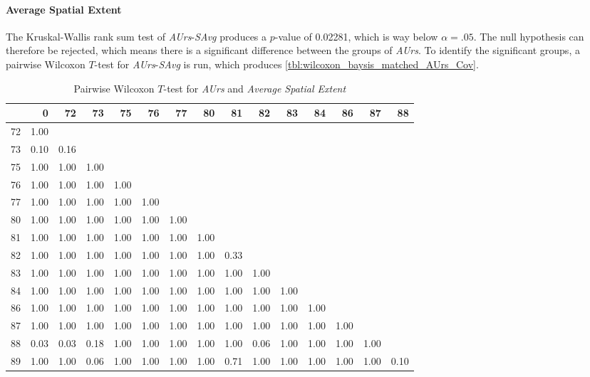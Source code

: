 \paragraph{Average Spatial Extent}
The Kruskal-Wallis rank sum test of \textit{AUrs}-\textit{SAvg} produces a $p$-value of 0.02281, which is way below $\alpha=.05$. The null hypothesis can therefore be rejected, which means there is a significant difference between the groups of \textit{AUrs}. To identify the significant groups, a pairwise Wilcoxon $T$-test for \textit{AUrs}-\textit{SAvg} is run, which produces \cref{tbl:wilcoxon_baysis_matched_AUrs_Cov}.
\begin{table}[ht]
	\tiny
	\centering
	\begin{tabular}{rrrrrrrrrrrrrrr}
		\toprule
		& 0 & 72 & 73 & 75 & 76 & 77 & 80 & 81 & 82 & 83 & 84 & 86 & 87 & 88 \\ 
		\midrule
		72 & 1.00 &  &  &  &  &  &  &  &  &  &  &  &  &  \\ 
		73 & 0.10 & 0.16 &  &  &  &  &  &  &  &  &  &  &  &  \\ 
		75 & 1.00 & 1.00 & 1.00 &  &  &  &  &  &  &  &  &  &  &  \\ 
		76 & 1.00 & 1.00 & 1.00 & 1.00 &  &  &  &  &  &  &  &  &  &  \\ 
		77 & 1.00 & 1.00 & 1.00 & 1.00 & 1.00 &  &  &  &  &  &  &  &  &  \\ 
		80 & 1.00 & 1.00 & 1.00 & 1.00 & 1.00 & 1.00 &  &  &  &  &  &  &  &  \\ 
		81 & 1.00 & 1.00 & 1.00 & 1.00 & 1.00 & 1.00 & 1.00 &  &  &  &  &  &  &  \\ 
		82 & 1.00 & 1.00 & 1.00 & 1.00 & 1.00 & 1.00 & 1.00 & 0.33 &  &  &  &  &  &  \\ 
		83 & 1.00 & 1.00 & 1.00 & 1.00 & 1.00 & 1.00 & 1.00 & 1.00 & 1.00 &  &  &  &  &  \\ 
		84 & 1.00 & 1.00 & 1.00 & 1.00 & 1.00 & 1.00 & 1.00 & 1.00 & 1.00 & 1.00 &  &  &  &  \\ 
		86 & 1.00 & 1.00 & 1.00 & 1.00 & 1.00 & 1.00 & 1.00 & 1.00 & 1.00 & 1.00 & 1.00 &  &  &  \\ 
		87 & 1.00 & 1.00 & 1.00 & 1.00 & 1.00 & 1.00 & 1.00 & 1.00 & 1.00 & 1.00 & 1.00 & 1.00 &  &  \\ 
		88 & 0.03 & 0.03 & 0.18 & 1.00 & 1.00 & 1.00 & 1.00 & 1.00 & 0.06 & 1.00 & 1.00 & 1.00 & 1.00 &  \\ 
		89 & 1.00 & 1.00 & 0.06 & 1.00 & 1.00 & 1.00 & 1.00 & 0.71 & 1.00 & 1.00 & 1.00 & 1.00 & 1.00 & 0.10 \\ 
		\bottomrule
	\end{tabular}
	\caption{Pairwise Wilcoxon $T$-test for \textit{AUrs} and \textit{Average Spatial Extent}}
	\label{tbl:wilcoxon_baysis_matched_AUrs_SAvg}
\end{table}
